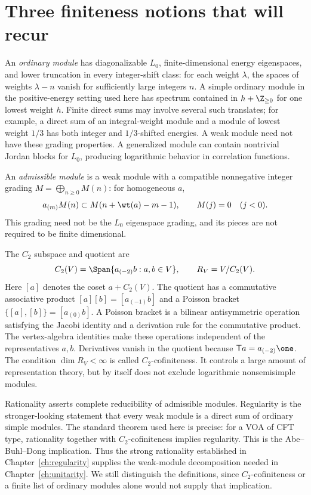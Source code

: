 \section{Three finiteness notions that will recur}

An \emph{ordinary module} has diagonalizable $L_0$, finite-dimensional
energy eigenspaces, and lower truncation in every integer-shift
class: for each weight $\lambda$, the spaces of weights
$\lambda-n$ vanish for sufficiently large integers $n$.
A simple ordinary module in the positive-energy setting used here
has spectrum contained in $h+\Z_{\ge0}$ for one lowest weight $h$.
Finite direct sums may involve several such translates; for example,
a direct sum of an integral-weight module and a module of lowest weight
$1/3$ has both integer and $1/3$-shifted energies.
A weak module need not have these grading
properties. A generalized module can contain nontrivial Jordan
blocks for $L_0$, producing logarithmic behavior in correlation
functions.

An \emph{admissible module} is a weak module with a compatible
nonnegative integer grading $M=\bigoplus_{n\ge0}M(n)$:
for homogeneous $a$,
\[
 a_{(m)}M(n)\subset M(n+\wt(a)-m-1),
 \qquad M(j)=0\quad(j<0).
\]
This grading need not be the $L_0$ eigenspace grading, and its pieces
are not required to be finite dimensional.

The $C_2$ subspace and quotient are
\begin{equation}
 C_2(V)=\Span\{a_{(-2)}b:a,b\in V\},\qquad
 R_V=V/C_2(V).
 \label{eq:voa-c2}
\end{equation}
Here $[a]$ denotes the coset $a+C_2(V)$. The quotient has a
commutative associative product
$[a][b]=[a_{(-1)}b]$ and a Poisson bracket
$\{[a],[b]\}=[a_{(0)}b]$. A Poisson bracket is a bilinear
antisymmetric operation satisfying the Jacobi identity and a
derivation rule for the commutative product. The vertex-algebra
identities make these operations independent of the representatives
$a,b$. Derivatives vanish in the quotient because
$\mathsf Ta=a_{(-2)}\one$. The condition
$\dim R_V<\infty$ is called $C_2$-cofiniteness. It controls a
large amount of representation theory, but by itself does not
exclude logarithmic nonsemisimple modules.

Rationality asserts complete reducibility of admissible modules.
Regularity is the stronger-looking
statement that every weak module is a direct sum of ordinary simple
modules. The standard theorem used here is precise: for a VOA of
CFT type, rationality together with $C_2$-cofiniteness implies
regularity. This is the Abe--Buhl--Dong implication. Thus the
strong rationality established in Chapter~\ref{ch:regularity}
supplies the weak-module decomposition needed in
Chapter~\ref{ch:unitarity}. We still distinguish the definitions,
since $C_2$-cofiniteness or a finite list of ordinary modules
alone would not supply that implication.

